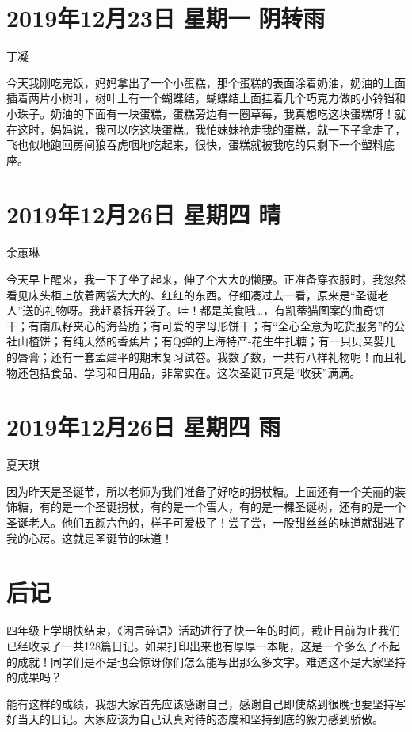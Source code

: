 \section{2019年12月23日 星期一 阴转雨}

丁凝

今天我刚吃完饭，妈妈拿出了一个小蛋糕，那个蛋糕的表面涂着奶油，奶油的上面插着两片小树叶，树叶上有一个蝴蝶结，蝴蝶结上面挂着几个巧克力做的小铃铛和小珠子。奶油的下面有一块蛋糕，蛋糕旁边有一圈草莓，我真想吃这块蛋糕呀！就在这时，妈妈说，我可以吃这块蛋糕。我怕妹妹抢走我的蛋糕，就一下子拿走了，飞也似地跑回房间狼吞虎咽地吃起来，很快，蛋糕就被我吃的只剩下一个塑料底座。

\section{2019年12月26日 星期四 晴}

余蕙琳

今天早上醒来，我一下子坐了起来，伸了个大大的懒腰。正准备穿衣服时，我忽然看见床头柜上放着两袋大大的、红红的东西。仔细凑过去一看，原来是``圣诞老人''送的礼物呀。我赶紧拆开袋子。哇！都是美食哦\ldots，有凯蒂猫图案的曲奇饼干；有南瓜籽夹心的海苔脆；有可爱的字母形饼干；有``全心全意为吃货服务''的公社山楂饼；有纯天然的香蕉片；有Q弹的上海特产-花生牛扎糖；有一只贝亲婴儿的唇膏；还有一套孟建平的期末复习试卷。我数了数，一共有八样礼物呢！而且礼物还包括食品、学习和日用品，非常实在。这次圣诞节真是``收获''满满。

\section{2019年12月26日 星期四 雨}

夏天琪

因为昨天是圣诞节，所以老师为我们准备了好吃的拐杖糖。上面还有一个美丽的装饰糖，有的是一个圣诞拐杖，有的是一个雪人，有的是一棵圣诞树，还有的是一个圣诞老人。他们五颜六色的，样子可爱极了！尝了尝，一股甜丝丝的味道就甜进了我的心房。这就是圣诞节的味道！

\section{后记}

四年级上学期快结束，《闲言碎语》活动进行了快一年的时间，截止目前为止我们已经收录了一共128篇日记。如果打印出来也有厚厚一本呢，这是一个多么了不起的成就！同学们是不是也会惊讶你们怎么能写出那么多文字。难道这不是大家坚持的成果吗？

能有这样的成绩，我想大家首先应该感谢自己，感谢自己即使熬到很晚也要坚持写好当天的日记。大家应该为自己认真对待的态度和坚持到底的毅力感到骄傲。

